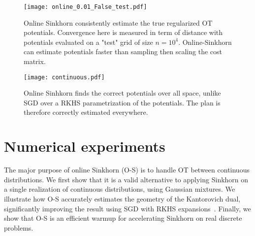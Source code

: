 \begin{figure}[t]
    \centering
    \texttt{[image: online\_0.01\_False\_test.pdf]}
    \caption{Online Sinkhorn consistently estimate the true regularized OT potentials. Convergence here is measured in term of distance with potentials evaluated on a "test" grid of size $n=10^4$. Online-Sinkhorn can estimate potentials faster than sampling then scaling the cost matrix.}
    \label{fig:convergence}
\end{figure}

\begin{figure}[t]
    \centering
    \texttt{[image: continuous.pdf]}
    \caption{Online Sinhkorn finds the correct potentials over all space, unlike SGD over a RKHS parametrization of the potentials. The plan is therefore correctly estimated everywhere.}
    \label{fig:potentials}
\end{figure}

\section{Numerical experiments}\label{sec:exps}



The major purpose of online Sinkhorn (O-S) is to handle OT between continuous
distributions.  We first show that it is a valid alternative to applying Sinkhorn on a single realization of continuous distributions, using Gaussian mixtures. We illustrate how O-S accurately estimates the geometry of
the Kantorovich dual, significantly improving the result using SGD with RKHS
expansions~\citep{2016-genevay-nips}. Finally, we show that O-S
is an efficient warmup for accelerating Sinkhorn on real discrete problems.


